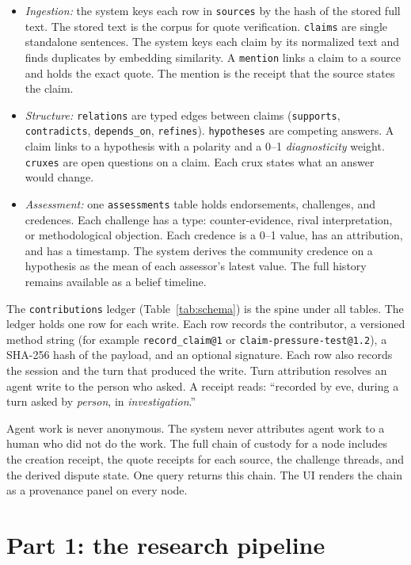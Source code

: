 \documentclass[10pt,twocolumn]{article}
\newcommand{\code}[1]{\texttt{\small #1}}
\begin{document}
\begin{itemize}
\item \emph{Ingestion:} the system keys each row in \code{sources} by the
  hash of the stored full text. The stored text is the corpus for quote
  verification. \code{claims} are single standalone sentences. The system
  keys each claim by its normalized text and finds duplicates by
  embedding similarity. A \code{mention} links a claim to a source and
  holds the exact quote. The mention is the receipt that the source
  states the claim.
\item \emph{Structure:} \code{relations} are typed edges between claims
  (\code{supports}, \code{contradicts}, \code{depends\_on},
  \code{refines}). \code{hypotheses} are competing answers. A claim links
  to a hypothesis with a polarity and a 0--1 \emph{diagnosticity} weight.
  \code{cruxes} are open questions on a claim. Each crux states what an
  answer would change.
\item \emph{Assessment:} one \code{assessments} table holds endorsements,
  challenges, and credences. Each challenge has a type: counter-evidence,
  rival interpretation, or methodological objection. Each credence is a
  0--1 value, has an attribution, and has a timestamp. The system derives
  the community credence on a hypothesis as the mean of each assessor's
  latest value. The full history remains available as a belief timeline.
\end{itemize}

The \code{contributions} ledger (Table~\ref{tab:schema}) is the spine
under all tables. The ledger holds one row for each write. Each row
records the contributor, a versioned method string (for example
\code{record\_claim@1} or \code{claim-pressure-test@1.2}), a SHA-256 hash
of the payload, and an optional signature. Each row also records the
session and the turn that produced the write. Turn attribution resolves
an agent write to the person who asked. A receipt reads: ``recorded by
eve, during a turn asked by \emph{person}, in \emph{investigation}.''

Agent work is never anonymous. The system never attributes agent work to
a human who did not do the work. The full chain of custody for a node
includes the creation receipt, the quote receipts for each source, the
challenge threads, and the derived dispute state. One query returns this
chain. The UI renders the chain as a provenance panel on every node.
\section{Part 1: the research pipeline}
\label{sec:pipeline}
\end{document}
